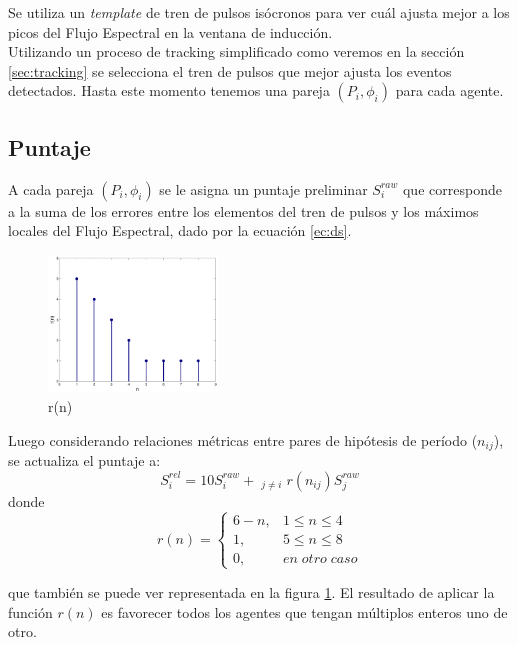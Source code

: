 \documentclass[12pt,a4paper,titlepage]{report}
\begin{document}
Se utiliza un \emph{template} de tren de pulsos isócronos para ver cuál ajusta mejor a los picos del Flujo Espectral en la ventana de inducción.\\

Utilizando un proceso de tracking simplificado como veremos en la sección \ref{sec:tracking} se selecciona el tren de pulsos que mejor ajusta los eventos detectados. Hasta este momento tenemos una pareja $(P_i,\phi _i)$ para cada agente.

\subsection{Puntaje}

A cada pareja $(P_i,\phi _i)$ se le asigna un puntaje preliminar $S_i^{raw}$ que corresponde a la suma de los errores entre los elementos del tren de pulsos y los máximos locales del Flujo Espectral, dado por la ecuación \ref{ec:ds}.\\

\begin{figure}
	\vspace{-25pt}
	\begin{center}
	\includegraphics[width=0.4\textwidth]{./pics/r.pdf}
	\end{center}
	\vspace{-20pt}
	\caption{r(n)}
	\label{fig:r}
	\vspace{-35pt}
\end{figure}

Luego considerando relaciones métricas entre pares de hipótesis de período ($n_{ij}$), se actualiza el puntaje a:
$$S^{rel}_i=10S_i^{raw}+\mathop{\sum\limits_{j=0}^{N}}_{j \neq i}r(n_{ij})S_j^{raw}$$ donde 
$$r(n)= \begin{cases}
6-n, & 1\leq n \leq 4\\
1, & 5\leq n \leq 8\\
0, & en\;otro\;caso
\end{cases}
$$

que también se puede ver representada en la figura \ref{fig:r}. El resultado de aplicar la función $r(n)$ es favorecer todos los agentes que tengan múltiplos enteros uno de otro.\\
\end{document}

